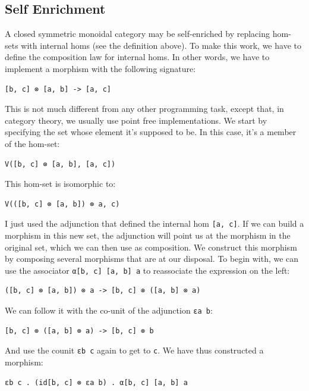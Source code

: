 \subsection{Self Enrichment}\label{self-enrichment}

A closed symmetric monoidal category may be self-enriched by replacing
hom-sets with internal homs (see the definition above). To make this
work, we have to define the composition law for internal homs. In other
words, we have to implement a morphism with the following signature:

\begin{verbatim}
[b, c] ⊗ [a, b] -> [a, c]
\end{verbatim}

This is not much different from any other programming task, except that,
in category theory, we usually use point free implementations. We start
by specifying the set whose element it's supposed to be. In this case,
it's a member of the hom-set:

\begin{verbatim}
V([b, c] ⊗ [a, b], [a, c])
\end{verbatim}

This hom-set is isomorphic to:

\begin{verbatim}
V(([b, c] ⊗ [a, b]) ⊗ a, c)
\end{verbatim}

I just used the adjunction that defined the internal hom
\texttt{{[}a,\ c{]}}. If we can build a morphism in this new set, the
adjunction will point us at the morphism in the original set, which we
can then use as composition. We construct this morphism by composing
several morphisms that are at our disposal. To begin with, we can use
the associator \texttt{α{[}b,\ c{]}\ {[}a,\ b{]}\ a} to reassociate the
expression on the left:

\begin{verbatim}
([b, c] ⊗ [a, b]) ⊗ a -> [b, c] ⊗ ([a, b] ⊗ a)
\end{verbatim}

We can follow it with the co-unit of the adjunction \texttt{εa\ b}:

\begin{verbatim}
[b, c] ⊗ ([a, b] ⊗ a) -> [b, c] ⊗ b
\end{verbatim}

And use the counit \texttt{εb\ c} again to get to \texttt{c}. We have
thus constructed a morphism:

\begin{verbatim}
εb c . (id[b, c] ⊗ εa b) . α[b, c] [a, b] a
\end{verbatim}

